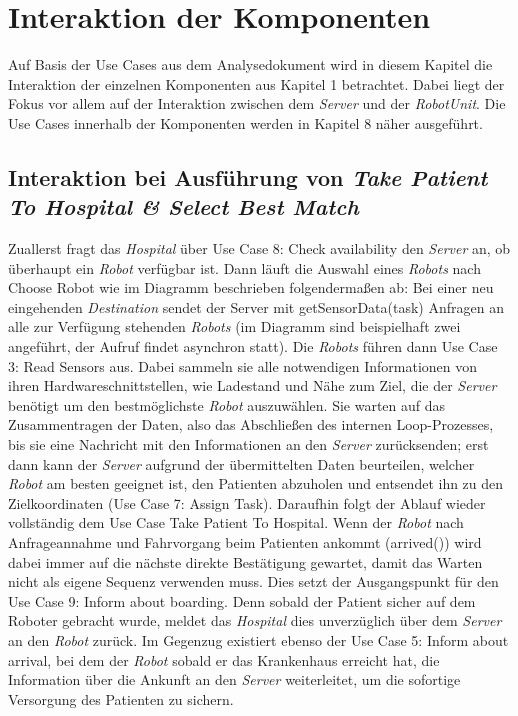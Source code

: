 \section{Interaktion der Komponenten}
Auf Basis der Use Cases aus dem Analysedokument wird in diesem Kapitel die Interaktion der einzelnen Komponenten aus Kapitel 1 betrachtet. Dabei liegt der Fokus vor allem auf der Interaktion zwischen dem \emph{Server} und der \emph{RobotUnit}. Die Use Cases innerhalb der Komponenten werden in Kapitel 8 näher ausgeführt. \\


\subsection*{Interaktion bei Ausführung von \emph{Take Patient To Hospital & Select Best Match}}

Zuallerst fragt das \emph{Hospital} über Use Case 8: Check availability den \emph{Server} an, ob überhaupt ein \emph{Robot} verfügbar ist. Dann läuft die Auswahl eines \emph{Robots} nach Choose Robot wie im Diagramm beschrieben folgendermaßen ab: Bei einer neu eingehenden \emph{Destination} sendet der Server mit getSensorData(task) Anfragen an alle zur Verfügung stehenden \emph{Robots} (im Diagramm sind beispielhaft zwei angeführt, der Aufruf findet asynchron statt). Die \emph{Robots} führen dann Use Case 3: Read Sensors aus. Dabei sammeln sie alle notwendigen Informationen von ihren Hardwareschnittstellen, wie Ladestand und Nähe zum Ziel, die der \emph{Server} benötigt um den bestmöglichste \emph{Robot} auszuwählen. Sie warten auf das Zusammentragen der Daten, also das Abschließen des internen Loop-Prozesses, bis sie eine Nachricht mit den Informationen an den \emph{Server} zurücksenden; erst dann kann der \emph{Server} aufgrund der übermittelten Daten beurteilen, welcher \emph{Robot} am besten geeignet ist, den Patienten abzuholen und entsendet ihn zu den Zielkoordinaten (Use Case 7: Assign Task). Daraufhin folgt der Ablauf wieder vollständig dem Use Case Take Patient To Hospital. Wenn der \emph{Robot} nach Anfrageannahme und Fahrvorgang beim Patienten ankommt (arrived()) wird dabei immer auf die nächste direkte Bestätigung gewartet, damit das Warten nicht als eigene Sequenz verwenden muss. Dies setzt der Ausgangspunkt für den Use Case 9: Inform about boarding. Denn sobald der Patient sicher auf dem Roboter gebracht wurde, meldet das \emph{Hospital} dies unverzüglich über dem \emph{Server} an den \emph{Robot} zurück. Im Gegenzug existiert ebenso der Use Case 5: Inform about arrival, bei dem der \emph{Robot} sobald er das Krankenhaus erreicht hat, die Information über die Ankunft an den \emph{Server} weiterleitet, um die sofortige Versorgung des Patienten zu sichern.

